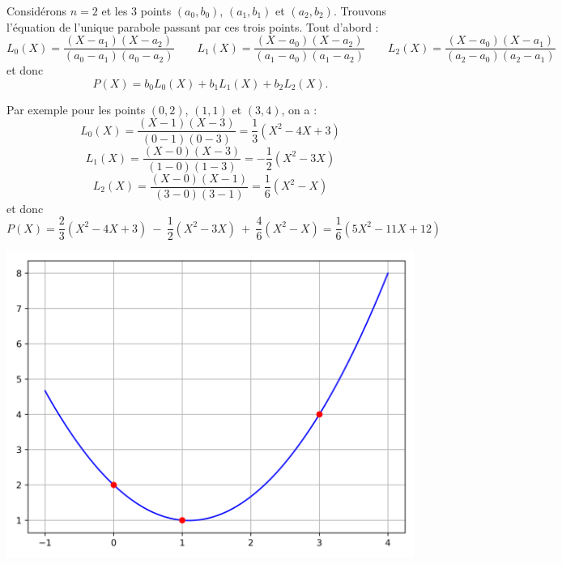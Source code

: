 \documentclass[11pt,class=report,crop=false]{standalone}
\begin{document}
\begin{exemple}
Considérons $n=2$ et les $3$ points $(a_0,b_0)$, $(a_1,b_1)$ et $(a_2,b_2)$.
Trouvons l'équation de l'unique parabole passant par ces trois points. 
Tout d'abord :
$$L_0(X) = \frac{(X-a_1)(X-a_2)}{(a_0-a_1)(a_0-a_2)} \qquad L_1(X) = \frac{(X-a_0)(X-a_2)}{(a_1-a_0)(a_1-a_2)} \qquad L_2(X) = \frac{(X-a_0)(X-a_1)}{(a_2-a_0)(a_2-a_1)}$$
et donc
$$P(X) = b_0 L_0(X) + b_1 L_1(X) + b_2 L_2(X).$$

Par exemple pour les points $(0,2)$, $(1,1)$ et $(3,4)$, on a :
$$L_0(X) = \frac{(X-1)(X-3)}{(0-1)(0-3)} = \frac{1}{3}(X^2-4X+3)$$
$$L_1(X) = \frac{(X-0)(X-3)}{(1-0)(1-3)} = -\frac{1}{2}(X^2-3X)$$
$$L_2(X) = \frac{(X-0)(X-1)}{(3-0)(3-1)} = \frac{1}{6}(X^2-X)$$
et donc
$$P(X) = \frac{2}{3}(X^2-4X+3) \ - \ \frac{1}{2}(X^2-3X) \  + \  \frac{4}{6}(X^2-X)
= \frac16(5X^2-11X+12)$$

\begin{center}
  \includegraphics[scale=\myscale,scale=0.5]{figures/approx-lagrange-02}
\end{center}

\end{exemple}
\end{document}
